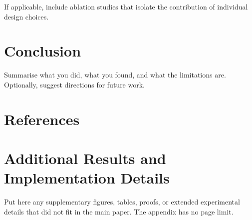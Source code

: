 \documentclass{article}
\begin{document}
If applicable, include ablation studies that isolate the contribution
of individual design choices.

\section{Conclusion}

Summarise what you did, what you found, and what the limitations are.
Optionally, suggest directions for future work.

\section*{References}

\small

%

\appendix

\section{Additional Results and Implementation Details}

Put here any supplementary figures, tables, proofs, or extended
experimental details that did not fit in the main paper.
The appendix has no page limit.
\end{document}
